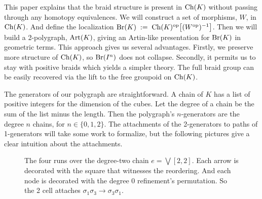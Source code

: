 \documentclass[11pt]{article}
\begin{document}
This paper explains that the braid structure is present in $\operatorname{Ch}(K)$ without passing through 
any homotopy equivalences. We will construct a set of morphisms, $W$, in $\operatorname{Ch}(K)$. 
And define the localization $\operatorname{Br}(K) \;:=\; \operatorname{Ch}(K)^{\mathrm{op}}\bigl[(W^{\mathrm{op}})^{-1}\bigr]$. Then we will build a 
2-polygraph, $\operatorname{Art}(K)$, giving an Artin-like presentation for $\operatorname{Br}(K)$ in geometric terms. This approach gives 
us several advantages. Firstly, we preserve more structure of $\operatorname{Ch}(K)$, so $\operatorname{Br}(I^{n})$ does not collapse.
Secondly, it permits us to stay with positive braids which yields a simpler theory.
The full braid group can be easily recovered via the lift to the free groupoid on $\operatorname{Ch}(K)$.

The generators of our polygraph are straightforward. A chain of $K$ has a list of positive integers
for the dimension of the cubes. Let the degree of a chain be the sum of the list minus the length.
Then the polygraph's $n$-generators are the degree $n$ chains, for $n \in \{0,1,2\}$. The attachments
of the 2-generators to paths of 1-generators will take some work to formalize, but the following pictures give 
a clear intuition about the attachments. 

\begin{figure}[p]
\centering
{}
\caption{The four runs over the degree-two chain $e = \bigvee[2,2]$. 
Each arrow is decorated with the square that witnesses the reordering. 
And each node is decorated with the degree 0 refinement's permutation.
So the 2 cell attaches $\sigma_1\sigma_3 \to \sigma_3 \sigma_1$.
}
\label{fig:species-sq}
\end{figure}
\end{document}
